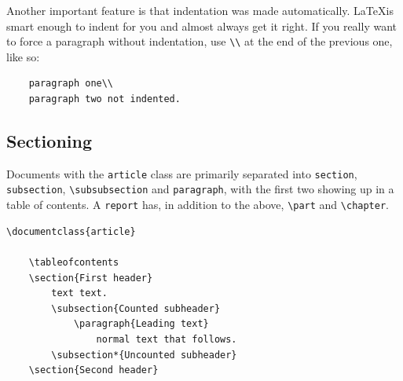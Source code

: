 Another important feature is that indentation was made automatically.
\LaTeX is smart enough to indent for you and almost always get it right.
If you really want to force a paragraph without indentation, use \verb|\\| at the end of the previous one, like so:
\begin{lstlisting}
    paragraph one\\
    paragraph two not indented.
\end{lstlisting}

\subsection{Sectioning}
Documents with the \texttt{article} class are primarily separated into \verb|section|, \verb|subsection|, \verb|\subsubsection| and \verb|paragraph|, with the first two showing up in a table of contents.
A \texttt{report} has, in addition to the above, \verb|\part| and \verb|\chapter|.

\begin{lstlisting}[caption=\texttt{example2.tex}]
\documentclass{article}

    \tableofcontents
    \section{First header}
        text text.
        \subsection{Counted subheader}
            \paragraph{Leading text}
                normal text that follows.
        \subsection*{Uncounted subheader}
    \section{Second header}

\end{lstlisting}

